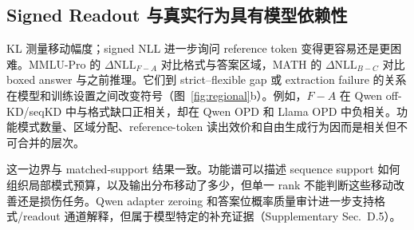 \subsection{Signed Readout 与真实行为具有模型依赖性}

KL 测量移动幅度；signed NLL 进一步询问 reference token 变得更容易还是更困难。MMLU-Pro 的 $\Delta\mathrm{NLL}_{F-A}$ 对比格式与答案区域，MATH 的 $\Delta\mathrm{NLL}_{B-C}$ 对比 boxed answer 与之前推理。它们到 strict--flexible gap 或 extraction failure 的关系在模型和训练设置之间改变符号（图~\ref{fig:regional}b）。例如，$F-A$ 在 Qwen off-KD/seqKD 中与格式缺口正相关，却在 Qwen OPD 和 Llama OPD 中负相关。功能模式数量、区域分配、reference-token 读出效价和自由生成行为因而是相关但不可合并的层次。

这一边界与 matched-support 结果一致。功能谱可以描述 sequence support 如何组织局部模式预算，以及输出分布移动了多少，但单一 rank 不能判断这些移动改善还是损伤任务。Qwen adapter zeroing 和答案位概率质量审计进一步支持格式/readout 通道解释，但属于模型特定的补充证据（Supplementary Sec.~D.5）。
